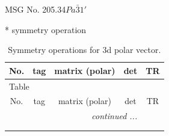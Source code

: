 \documentclass[fleqn,8pt]{jsarticle}
\begin{document}
\setcounter{MaxMatrixCols}{32}

\renewcommand{\tablename}{Table~}
\renewcommand{\figurename}{Figure~}
\begin{center}
\LARGE
MSG No. 205.34\quad$Pa\bar{3}1'$
\end{center}
* symmetry operation
\renewcommand{\arraystretch}{1.3}
\begin{longtable}{ccccc}
\caption{Symmetry operations for 3d polar vector.}
 \\
 \hline \hline
No. & tag & matrix (polar) & det & TR \\ \hline \endfirsthead

\multicolumn{4}{l}{\tablename\ \thetable{}} \\
 \hline \hline
No. & tag & matrix (polar) & det & TR \\ \hline \endhead

 \hline \hline
\multicolumn{4}{r}{\footnotesize\it continued ...} \\ \endfoot

 \hline \hline
\multicolumn{4}{r}{} \\ \endlastfoot


\end{longtable}
\end{document}
